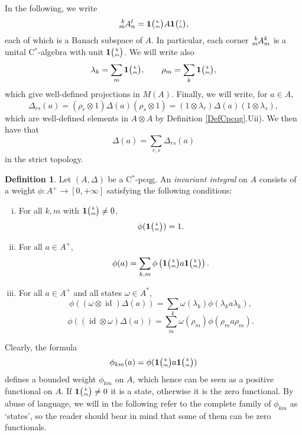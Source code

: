 \documentclass[11pt]{article}
\DeclareMathOperator{\id}{id}
\newcommand{\C}{\mathbb{C}}
\newcommand{\Grt}[3]{#1{\tiny {\begin{pmatrix} #2\\#3\end{pmatrix}}}}
\newcommand{\UnitC}[2]{\Grt{\mathbf{1}}{#1}{#2}}
\newcommand{\Gr}[5]{\tensor*[^{#2}_{#4}]{#1}{^{#3}_{#5}}}%
\theoremstyle{definition}
\newtheorem{Def}[Theorem]{Definition}
\numberwithin{equation}{section}
\begin{document}
In the following, we write \[\Gr{A}{k}{l}{m}{n} = \UnitC{k}{m}A\UnitC{l}{n},\] each of which is a Banach subspace of $A$. In particular, each corner $\Gr{A}{k}{k}{m}{m}$ is a unital C$^*$-algebra with unit $\UnitC{k}{m}$. We will write also \[\lambda_k = \sum_{m}\UnitC{k}{m},\qquad \rho_m = \sum_{k}\UnitC{k}{m},\] which give well-defined projections in $M(A)$. Finally, we will write, for $a\in A$, \[\Delta_{rs}(a) = (\rho_r\otimes 1)\Delta(a)(\rho_s\otimes 1) = (1\otimes \lambda_r)\Delta(a)(1\otimes \lambda_s),\] which are well-defined elements in $A\otimes A$ by Definition \ref{DefCpcqg}.Uii). We then have that  \[\Delta(a) = \sum_{r,s} \Delta_{rs}(a)\] in the strict topology. 

\begin{Def} Let $(A,\Delta)$ be a C$^*$-pcqg. An \emph{invariant integral} on $A$ consists of a weight $\phi: A^+ \rightarrow [0,+\infty]$ satisfying the following conditions:
\begin{enumerate}[i)]
\item For all $k,m$ with $\UnitC{k}{m}\neq 0$, \[\phi(\UnitC{k}{m}) = 1.\]
\item For all $a\in A^+$, \[\phi(a) = \sum_{k,m} \phi\left(\UnitC{k}{m}a\UnitC{k}{m}\right).\]
\item For all $a\in A^+$ and all states $\omega\in A^*$, \begin{equation}\label{EqInvL} \phi((\omega \otimes \id)\Delta(a)) = \sum_{k} \omega(\lambda_k)\phi(\lambda_ka\lambda_k),\end{equation} \begin{equation}\label{EqInvR} \phi((\id\otimes \omega)\Delta(a)) = \sum_{m}\omega(\rho_m)\phi(\rho_ma\rho_m).\end{equation}
\end{enumerate} 
\end{Def}





Clearly, the formula \[\phi_{km}(a) = \phi(\UnitC{k}{m}a\UnitC{k}{m})\] defines a bounded weight $\phi_{km}$ on $A$, which hence can be seen as a positive functional on $A$. If $\UnitC{k}{m}\neq 0$ it is a state, otherwise it is the zero functional. By abuse of language, we will in the following refer to the complete family of $\phi_{km}$ as `states', so the reader should bear in mind that some of them can be zero functionals.
\end{document}
